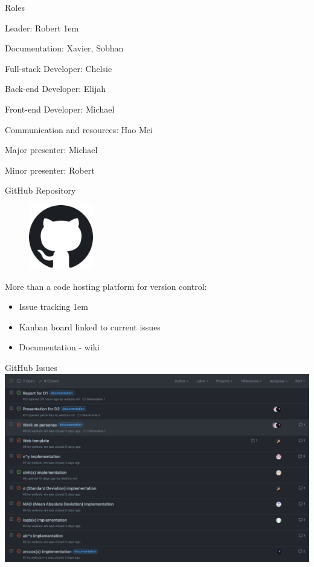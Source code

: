 \documentclass[12pt]{beamer}
\begin{document}
\begin{frame}{Roles}
    \item \textcolor{colorgreen}{Leader:} Robert
    \itemsep1em
    \item \textcolor{colorgreen}{Documentation:} Xavier, Sobhan
    \item \textcolor{colorgreen}{Full-stack Developer:} Chelsie 
    \item \textcolor{colorgreen}{Back-end Developer:} Elijah
    \item \textcolor{colorgreen}{Front-end Developer:} Michael
    \item \textcolor{colorgreen}{Communication and resources:} Hao Mei
    \item \textcolor{colorgreen}{Major presenter:} Michael
    \item \textcolor{colorgreen}{Minor presenter:} Robert
\end{frame}

\begin{frame}{GitHub Repository}
    \begin{figure}
     \centering
     \includegraphics[width=0.25\textwidth]{images/github.png}       \end{figure}
    \item More than a code hosting platform for version control: \pause
    \begin{itemize}
        \item Issue tracking \pause
        \itemsep1em
        \item Kanban board linked to current issues \pause
        \item Documentation - wiki
    \end{itemize}
\end{frame}

\begin{frame}{GitHub Issues}
\includegraphics[width=1\linewidth]{images/issues.png}
\end{frame}
\end{document}
